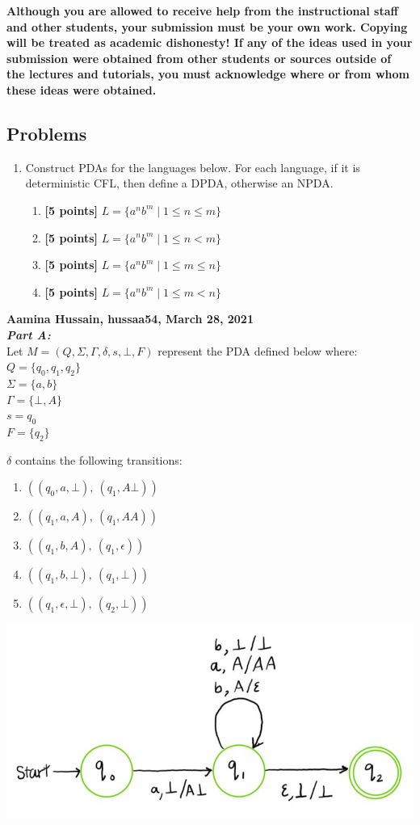 \documentclass[11pt,fleqn]{article}
\newcommand{\be}{\begin{enumerate}}
\newcommand{\ee}{\end{enumerate}}
\newcommand{\set}[1]{{\{ #1 \}}}
\begin{document}
	\textbf{Although you are allowed to receive help from the
		instructional staff and other students, your submission must be your
		own work.  Copying will be treated as academic dishonesty! If any of
		the ideas used in your submission were obtained from other students
		or sources outside of the lectures and tutorials, you must
		acknowledge where or from whom these ideas were obtained.}
	
	\newpage
	
	\subsection*{Problems}
	
	\be
	
	\item  Construct PDAs for the languages below. For each language, if it is deterministic CFL, then define a DPDA, otherwise an NPDA.
	\be
	\item\textbf{[5 points]} $L = \{a^nb^m \mid 1 \le n \le m \}
$
	\item\textbf{[5 points]} $L = \{a^nb^m \mid 1 \le n < m \}$
	\item\textbf{[5 points]} $L = \{a^nb^m \mid 1 \le m \le n \}$
	\item\textbf{[5 points]} $L = \{a^nb^m \mid 1 \le m < n \}$ 
	\ee

	\ee
	\textbf{Aamina Hussain, hussaa54, March 28, 2021}\\
	
	\noindent\textbf{\emph{Part A:}}\\
	Let $M = (Q, \Sigma, \Gamma, \delta, s, \bot, F)$ represent the PDA defined below where:\\
	$Q = \set{q_0, q_1, q_2}$\\
	$\Sigma = \set{a, b}$\\
	$\Gamma = \set{\bot, A}$\\
	$s = q_0$\\
	$F = \set{q_2}$

	\noindent$\delta$ contains the following transitions:
	\be
	\item $((q_0, a, \bot),\ (q_1, A\bot))$
	\item $((q_1, a, A),\ (q_1, AA))$
	\item $((q_1, b, A),\ (q_1, \epsilon))$
	\item $((q_1, b, \bot),\ (q_1, \bot))$
	\item $((q_1, \epsilon, \bot),\ (q_2, \bot))$
	\ee

	\begin{center}
	\includegraphics[scale = 0.5]{A8partA.JPG}
	\end{center}
	
\end{document}
